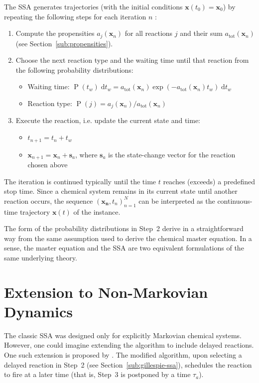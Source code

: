 \documentclass[english,letterpaper,12pt]{report}
\newcommand{\dee}{\;\mathrm{d}}
\renewcommand{\vec}[1]{\ensuremath{\mathbf{#1}}}
\DeclareMathOperator{\Prob}{P}
\begin{document}
\begin{doublespacing}
The SSA generates trajectories (with the initial conditions $\vec{x}(t_0) = \vec{x}_0$) by repeating the following steps for each iteration $n$ \cite{gillespie-ssa}:
\begin{enumerate}
    \item Compute the propensities $a_j(\vec{x}_n)$ for all reactions $j$ and their sum $a_\text{tot}(\vec{x}_n)$ (see Section~\ref{sub:propensities}).
    \item Choose the next reaction type and the waiting time until that reaction from the following probability distributions:
    \begin{itemize}
        \item Waiting time: $\Prob(t_w)\dee t_w = a_\text{tot}(\vec{x}_n) \exp(-a_\text{tot}(\vec{x}_n) t_w) \dee t_w$
        \item Reaction type: $\Prob(j) = a_j(\vec{x}_n) / a_\text{tot}(\vec{x}_n)$
    \end{itemize}
    \item Execute the reaction, i.e. update the current state and time:
    \begin{itemize}
        \item $t_{n+1} = t_n + t_w$
        \item $\vec{x}_{n+1} = \vec{x}_n + \vec{s}_a$, where $\vec{s}_a$ is the state-change vector for the reaction chosen above
    \end{itemize}
\end{enumerate}
The iteration is continued typically until the time $t$ reaches (exceeds) a predefined stop time. Since a chemical system remains in its current state until another reaction occurs, the sequence $\left(\vec{x_n}, t_n\right)_{n=1}^N$ can be interpreted as the continuous-time trajectory $\vec{x}(t)$ of the instance.

The form of the probability distributions in Step~2 derive in a straightforward way from the same assumption used to derive the chemical master equation. In a sense, the master equation and the SSA are two equivalent formulations of the same underlying theory.


\section{Extension to Non-Markovian Dynamics} %
\label{sub:non-markovian}

The classic SSA was designed only for explicitly Markovian chemical systems. However, one could imagine extending the algorithm to include delayed reactions. One such extension is proposed by \cite{delay-oscillations}. The modified algorithm, upon selecting a delayed reaction in Step~2 (see Section~\ref{sub:gillespie-ssa}), schedules the reaction to fire at a later time (that is, Step~3 is postponed by a time $\tau_a$). 


\end{doublespacing}
\end{document}
